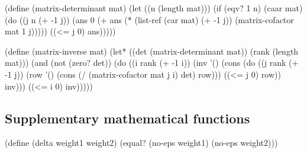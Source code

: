 \documentclass[a4paper,10pt]{article}
\theoremstyle{definition} \newtheorem{Def}{Definition}
\begin{document}
(define (matrix-determinant mat)
  (let ((n (length mat)))
    (if (eqv? 1 n) (caar mat)
        (do ((j n (+ -1 j))
             (ans 0 (+ ans (* (list-ref (car mat) (+ -1 j))
                              (matrix-cofactor mat 1 j)))))
            ((<= j 0) ans)))))


(define (matrix-inverse mat)
  (let* ((det (matrix-determinant mat))
         (rank (length mat)))
    (and (not (zero? det))
         (do ((i rank (+ -1 i))
              (inv '() (cons
                        (do ((j rank (+ -1 j))
                             (row '()
                                  (cons (/ (matrix-cofactor mat j i) det) row)))
                            ((<= j 0) row))
                        inv)))
             ((<= i 0) inv)))))

\nwendcode{}\nwdocspar

\subsection{Supplementary mathematical functions}
\label{sec:suppl-math-funct}

\nwenddocs{}\endmoddef

(define (delta weight1 weight2)
  (equal? (no-eps weight1) (no-eps weight2)))
\nwendcode{}
\end{document}
